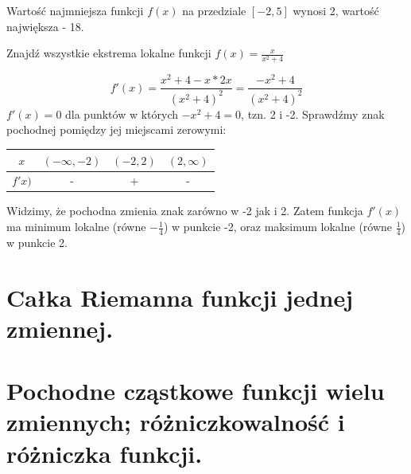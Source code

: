 \documentclass[12pt]{article}
\begin{document}
        Wartość najmniejsza funkcji $f(x)$ na przedziale $[-2, 5]$ wynosi 2, wartość największa - 18.

        
        \begin{exercise}
            Znajdź wszystkie ekstrema lokalne funkcji $f(x) = \frac{x}{x^2 + 4}$
        \end{exercise}
        
        $$f'(x) = \frac{x^2 + 4 - x * 2x}{(x^2 + 4)^2} = \frac{-x^2 + 4}{(x^2 + 4)^2}$$
        $f'(x) = 0$ dla punktów w których $-x^2 + 4 = 0$, tzn. 2 i -2. Sprawdźmy znak pochodnej pomiędzy jej miejscami zerowymi:
    
        \begin{center}
            \begin{tabular}{c||c|c|c}
                $x$ &$(-\infty, -2)$ & $(-2, 2)$ & $(2, \infty)$ \\
                \hline
                $f'x)$ & - & + & -
            \end{tabular}
        \end{center}
        
        Widzimy, że pochodna zmienia znak zarówno w -2 jak i 2. Zatem funkcja $f'(x)$ ma minimum lokalne (równe $-\frac{1}{4}$) w punkcie -2, oraz maksimum lokalne (równe $\frac{1}{4}$) w punkcie 2.
        
    \newpage

    \section{Całka Riemanna funkcji jednej zmiennej.}

    \newpage

    \section{Pochodne cząstkowe funkcji wielu zmiennych; różniczkowalność i różniczka funkcji.}
\end{document}
